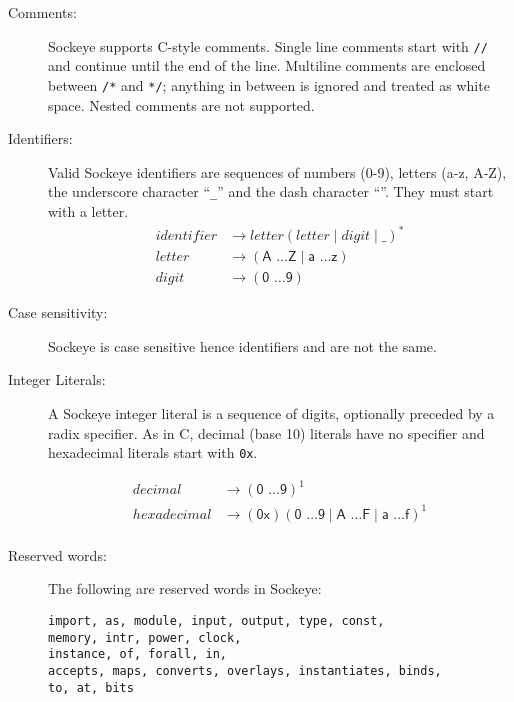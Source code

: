 \documentclass[a4paper,11pt,twoside]{report}
\begin{document}
{{{\begin{description}
\item[Comments:] Sockeye supports C-style comments.  Single line comments
  start with \texttt{//} and continue until the end of the line.
  Multiline comments are enclosed between \texttt{/*} and \texttt{*/};
  anything in between is ignored and treated as white space.
  Nested comments are not supported.

\item[Identifiers:] Valid Sockeye identifiers are sequences of numbers
  (0-9), letters (a-z, A-Z), the underscore character ``\texttt{\_}'' and the dash character ``\textendash''. They
  must start with a letter.
  \begin{align*}
  identifier & \rightarrow letter (letter \mid digit \mid \text{\_})^{\textrm{*}} \\
  letter & \rightarrow (\textsf{A \ldots Z} \mid  \textsf{a \ldots z})\\
  digit & \rightarrow (\textsf{0 \ldots 9})
    \end{align*}

\item[Case sensitivity:] Sockeye is case sensitive hence identifiers  and  are not the same.
  
\item[Integer Literals:] A Sockeye integer literal is a sequence of
  digits, optionally preceded by a radix specifier.  As in C, decimal (base 10)
  literals have no specifier and hexadecimal literals start with
  \texttt{0x}.

\begin{align*}
decimal & \rightarrow (\textsf{0 \ldots 9})^{\textrm{1}}\\
hexadecimal & \rightarrow (\textsf{0x})(\textsf{0 \ldots 9} \mid \textsf{A \ldots F} \mid \textsf{a \ldots f})^{\textrm{1}}\\
\end{align*}

\item[Reserved words:] The following are reserved words in Sockeye:
\begin{verbatim}
import, as, module, input, output, type, const,
memory, intr, power, clock,
instance, of, forall, in,
accepts, maps, converts, overlays, instantiates, binds,
to, at, bits
\end{verbatim}

\end{description}


}}}
\end{document}
